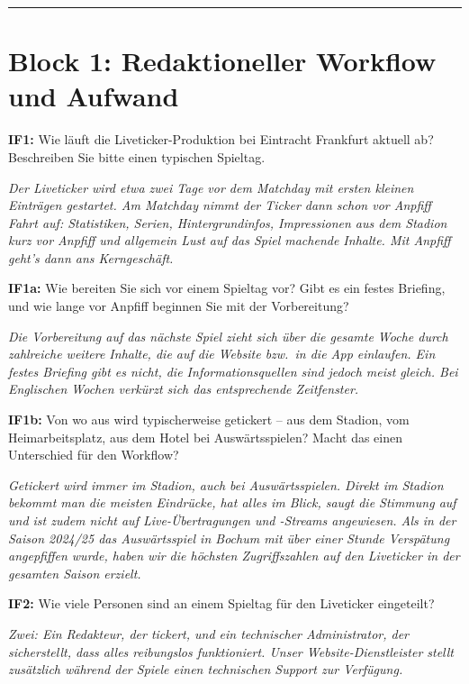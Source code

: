 \begin{center}\rule{0.5\linewidth}{0.5pt}\end{center}

\section{Block 1: Redaktioneller Workflow und Aufwand}

\textbf{IF1:} Wie läuft die Liveticker-Produktion bei Eintracht Frankfurt aktuell ab? Beschreiben Sie bitte einen typischen Spieltag.

\textit{Der Liveticker wird etwa zwei Tage vor dem Matchday mit ersten kleinen Einträgen gestartet. Am Matchday nimmt der Ticker dann schon vor Anpfiff Fahrt auf: Statistiken, Serien, Hintergrundinfos, Impressionen aus dem Stadion kurz vor Anpfiff und allgemein Lust auf das Spiel machende Inhalte. Mit Anpfiff geht's dann ans Kerngeschäft.}

\textbf{IF1a:} Wie bereiten Sie sich vor einem Spieltag vor? Gibt es ein festes Briefing, und wie lange vor Anpfiff beginnen Sie mit der Vorbereitung?

\textit{Die Vorbereitung auf das nächste Spiel zieht sich über die gesamte Woche durch zahlreiche weitere Inhalte, die auf die Website bzw.\ in die App einlaufen. Ein festes Briefing gibt es nicht, die Informationsquellen sind jedoch meist gleich. Bei Englischen Wochen verkürzt sich das entsprechende Zeitfenster.}

\textbf{IF1b:} Von wo aus wird typischerweise getickert -- aus dem Stadion, vom Heimarbeitsplatz, aus dem Hotel bei Auswärtsspielen? Macht das einen Unterschied für den Workflow?

\textit{Getickert wird immer im Stadion, auch bei Auswärtsspielen. Direkt im Stadion bekommt man die meisten Eindrücke, hat alles im Blick, saugt die Stimmung auf und ist zudem nicht auf Live-Übertragungen und -Streams angewiesen. Als in der Saison 2024/25 das Auswärtsspiel in Bochum mit über einer Stunde Verspätung angepfiffen wurde, haben wir die höchsten Zugriffszahlen auf den Liveticker in der gesamten Saison erzielt.}

\textbf{IF2:} Wie viele Personen sind an einem Spieltag für den Liveticker eingeteilt?

\textit{Zwei: Ein Redakteur, der tickert, und ein technischer Administrator, der sicherstellt, dass alles reibungslos funktioniert. Unser Website-Dienstleister stellt zusätzlich während der Spiele einen technischen Support zur Verfügung.}


